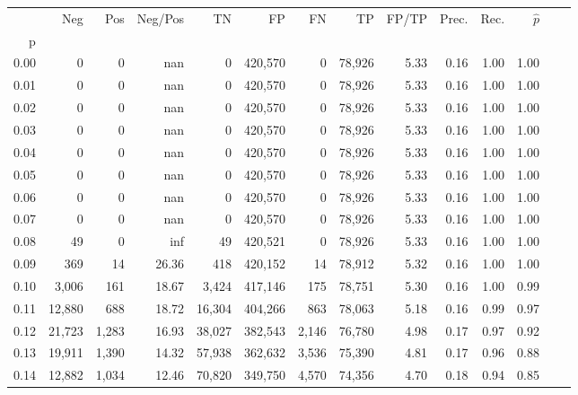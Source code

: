 \begin{tabular}{rrrrrrrrrrrrrr}
\toprule
{} &     Neg &    Pos & Neg/Pos &       TN &       FP &      FN &      TP & FP/TP & Prec. &  Rec. & $\hat{p}$ \\
p    &         &        &         &          &          &         &         &       &       &       &           \\
\midrule
0.00 &       0 &      0 &     nan &        0 &  420,570 &       0 &  78,926 &  5.33 &  0.16 &  1.00 &      1.00 \\
0.01 &       0 &      0 &     nan &        0 &  420,570 &       0 &  78,926 &  5.33 &  0.16 &  1.00 &      1.00 \\
0.02 &       0 &      0 &     nan &        0 &  420,570 &       0 &  78,926 &  5.33 &  0.16 &  1.00 &      1.00 \\
0.03 &       0 &      0 &     nan &        0 &  420,570 &       0 &  78,926 &  5.33 &  0.16 &  1.00 &      1.00 \\
0.04 &       0 &      0 &     nan &        0 &  420,570 &       0 &  78,926 &  5.33 &  0.16 &  1.00 &      1.00 \\
0.05 &       0 &      0 &     nan &        0 &  420,570 &       0 &  78,926 &  5.33 &  0.16 &  1.00 &      1.00 \\
0.06 &       0 &      0 &     nan &        0 &  420,570 &       0 &  78,926 &  5.33 &  0.16 &  1.00 &      1.00 \\
0.07 &       0 &      0 &     nan &        0 &  420,570 &       0 &  78,926 &  5.33 &  0.16 &  1.00 &      1.00 \\
0.08 &      49 &      0 &     inf &       49 &  420,521 &       0 &  78,926 &  5.33 &  0.16 &  1.00 &      1.00 \\
0.09 &     369 &     14 &   26.36 &      418 &  420,152 &      14 &  78,912 &  5.32 &  0.16 &  1.00 &      1.00 \\
0.10 &   3,006 &    161 &   18.67 &    3,424 &  417,146 &     175 &  78,751 &  5.30 &  0.16 &  1.00 &      0.99 \\
0.11 &  12,880 &    688 &   18.72 &   16,304 &  404,266 &     863 &  78,063 &  5.18 &  0.16 &  0.99 &      0.97 \\
0.12 &  21,723 &  1,283 &   16.93 &   38,027 &  382,543 &   2,146 &  76,780 &  4.98 &  0.17 &  0.97 &      0.92 \\
0.13 &  19,911 &  1,390 &   14.32 &   57,938 &  362,632 &   3,536 &  75,390 &  4.81 &  0.17 &  0.96 &      0.88 \\
0.14 &  12,882 &  1,034 &   12.46 &   70,820 &  349,750 &   4,570 &  74,356 &  4.70 &  0.18 &  0.94 &      0.85 \\

\end{tabular}
